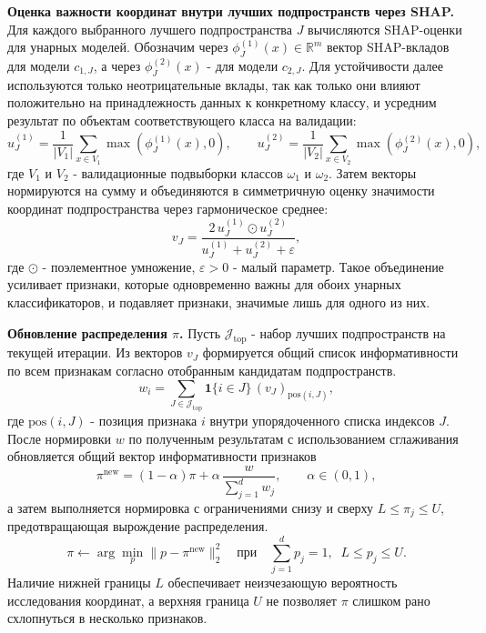 \documentclass[12pt,a4paper]{article}
\begin{document}
\medskip
\noindent\textbf{Оценка важности координат внутри лучших подпространств через SHAP.}
Для каждого выбранного лучшего подпространства $J$ вычисляются SHAP-оценки для унарных моделей.
Обозначим через $\phi^{(1)}_{J}(x)\in\mathbb{R}^{m}$ вектор SHAP-вкладов для модели $c_{1,J}$,
а через $\phi^{(2)}_{J}(x)$ - для модели $c_{2,J}$. Для устойчивости далее используются только
неотрицательные вклады, так как только они влияют положительно на принадлежность данных к конкретному классу, и усредним результат по объектам соответствующего класса на валидации:
\begin{equation}
u^{(1)}_{J}=\frac{1}{|V_1|}\sum_{x\in V_1}\max(\phi^{(1)}_{J}(x),0),\qquad
u^{(2)}_{J}=\frac{1}{|V_2|}\sum_{x\in V_2}\max(\phi^{(2)}_{J}(x),0),
\end{equation}
где $V_1$ и $V_2$ - валидационные подвыборки классов $\omega_1$ и $\omega_2$.
Затем векторы нормируются на сумму и объединяются в симметричную оценку значимости координат
подпространства через гармоническое среднее:
\begin{equation}
v_J=\frac{2\,u^{(1)}_{J}\odot u^{(2)}_{J}}{u^{(1)}_{J}+u^{(2)}_{J}+\varepsilon},
\end{equation}
где $\odot$ - поэлементное умножение, $\varepsilon>0$ - малый параметр.
Такое объединение усиливает признаки, которые одновременно важны для обоих унарных классификаторов,
и подавляет признаки, значимые лишь для одного из них.

\medskip
\noindent\textbf{Обновление распределения $\pi$.}
Пусть $\mathcal{J}_{\mathrm{top}}$ - набор лучших подпространств на текущей итерации.
Из векторов $v_J$ формируется общий список информативности по всем признакам согласно отобранным кандидатам подпространств.
\begin{equation}
w_i=\sum_{J\in\mathcal{J}_{\mathrm{top}}}\mathbf{1}\{i\in J\}\, (v_J)_{\mathrm{pos}(i,J)},
\end{equation}
где $\mathrm{pos}(i,J)$ - позиция признака $i$ внутри упорядоченного списка индексов $J$.
После нормировки $w$ по полученным результатам с использованием сглаживания обновляется общий вектор информативности признаков
\begin{equation}
\pi^{\mathrm{new}}=(1-\alpha)\pi+\alpha\,\frac{w}{\sum_{j=1}^d w_j},
\qquad \alpha\in(0,1),
\end{equation}
а затем выполняется нормировка с ограничениями снизу и сверху
$L\le \pi_j\le U$, предотвращающая вырождение распределения.
\begin{equation}
\pi \leftarrow \arg\min_{p}\|p-\pi^{\mathrm{new}}\|_2^2
\quad \text{при}\quad
\sum_{j=1}^d p_j=1,\;\; L\le p_j\le U.
\end{equation}
Наличие нижней границы $L$ обеспечивает неизчезающую вероятность исследования координат, а верхняя
граница $U$ не позволяет $\pi$ слишком рано схлопнуться в несколько признаков.
\end{document}
